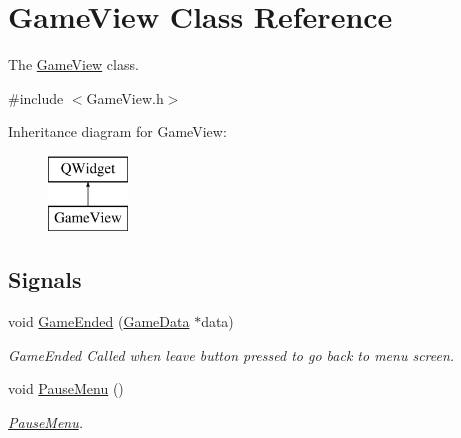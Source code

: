 \hypertarget{classGameView}{\section{Game\-View Class Reference}
\label{classGameView}
}


The \hyperlink{classGameView}{Game\-View} class.  




{\ttfamily \#include $<$Game\-View.\-h$>$}

Inheritance diagram for Game\-View\-:\begin{figure}[H]
\begin{center}
\leavevmode
\includegraphics[height=2.000000cm]{classGameView}
\end{center}
\end{figure}
\subsection*{Signals}
\begin{DoxyCompactItemize}
\item 
void \hyperlink{classGameView_a5901d54c9767a75549860cc5b511fcd5}{Game\-Ended} (\hyperlink{classGameData}{Game\-Data} $\ast$data)
\begin{DoxyCompactList}\small\item\em Game\-Ended Called when leave button pressed to go back to menu screen. \end{DoxyCompactList}\item 
\hypertarget{classGameView_a2d1aa868abc05055e5be27040660f7f0}{void \hyperlink{classGameView_a2d1aa868abc05055e5be27040660f7f0}{Pause\-Menu} ()}\label{classGameView_a2d1aa868abc05055e5be27040660f7f0}

\begin{DoxyCompactList}\small\item\em \hyperlink{classPauseMenu}{Pause\-Menu}. \end{DoxyCompactList}\end{DoxyCompactItemize}
